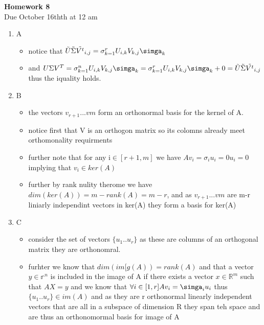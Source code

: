 \documentclass[12pt,twoside]{article}
\begin{document}
\begin{center}
{\large{\textbf{Homework 8}} } \vspace{0.2cm}\\
Due October 16thth at 12 am
\\
\end{center}
\begin{enumerate}[label=8.1]
\item A
\begin{itemize}
    \item notice that $\Tilde{U}\Tilde{\Sigma}\Tilde{V^t}_{i,j}=\sigma_{k=1}^{r}U_{i,k}V_{k,j}\simga_{k}$ 
    \item and $U\Sigma V^T=\sigma_{k=1}^{n}U_{i,k}V_{k,j}\simga_{k}=\sigma_{k=1}^{r}U_{i,k}V_{k,j}\simga_{k}+0=\Tilde{U}\Tilde{\Sigma}\Tilde{V^t}_{i,j}$ thus the iquality holds. 
\end{itemize}
\item B
\begin{itemize}
    \item the vectors $v_{r+1}...v{m}$ form an orthonormal basis for the kernel of A. 
    \item notice first that V is an orthogon matrix so its colomns already meet orthomonality requirments 
    \item further note that for any i$\in[r+1,m]$ we have $Av_i=\sigma_iu_i=0u_i=0$ implying that $v_i\in ker(A)$
    \item further by rank nulity therome we have $dim(ker(A))=m-rank(A)=m-r$, and as $v_{r+1}...v{m}$ are m-r liniarly independint vectors in ker(A) they form a basis for ker(A)
\end{itemize}
\item C
\begin{itemize}
    \item consider the set of vectors $\{u_1..u_r\}$ as these are columns of an orthogonal matrix they are orthonomral. 
    \item furhter we know that $dim(im[g(A))=rank(A)$ and that a vector $y\in \mathbb{r}^n$ is included in the image of A if there exists a vector $x\in \mathbb{R}^m$ such that $AX=y$ and we know that $\forall i\in[1,r] Av_i=\simga_iu_i$ thus $\{u_1..u_r\}\in im(A)$ and as they are r orthonormal linearly independent  vectors that are all in a subspace of dimension R they span teh space and are thus an orthonomormal basis for image of A
\end{itemize}
   \end{enumerate}
   
\end{document}

